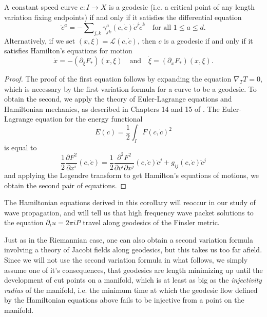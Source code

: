\begin{corollary}
  A constant speed curve $c: I \to X$ is a geodesic (i.e. a critical point of any length variation fixing endpoints) if and only if it satisfies the differential equation
  \[ \ddot{c}^a = - \sum\nolimits_{j,k} \gamma^a_{jk}(c,\dot{c}) \dot{c}^j \dot{c}^k \quad\text{for all $1 \leq a \leq d$}. \]
  Alternatively, if we set $(x,\xi) = \mathcal{L}(c,\dot{c})$, then $c$ is a geodesic if and only if it satisfies Hamilton's equations for motion
  \[ \dot{x} = - (\partial_\xi F_*)(x,\xi) \quad\text{and}\quad \dot{\xi} = (\partial_x F_*)(x,\xi). \]

\end{corollary}
\begin{proof}
  The proof of the first equation follows by expanding the equation $\nabla_T T = 0$, which is necessary by the first variation formula for a curve to be a geodesic. To obtain the second, we apply the theory of Euler-Lagrange equations and Hamiltonian mechanics, as described in Chapters 14 and 15 of \cite{Arnold}. The Euler-Lagrange equation for the energy functional
  \begin{equation}
    E(c) = \frac{1}{2} \int_I F(c,\dot{c})^2
  \end{equation}
  is equal to
  \begin{equation}
    \frac{1}{2} \frac{\partial F^2}{\partial x^i}(c,\dot{c}) = \frac{1}{2} \frac{\partial^2 F^2}{\partial v^i \partial x^j}(c,\dot{c}) \dot{c}^j + g_{ij}(c,\dot{c}) \ddot{c}^j
  \end{equation}
  and applying the Legendre transform to get Hamilton's equations of motions, we obtain the second pair of equations.
\end{proof}

\begin{remark}
  The Hamiltonian equations derived in this corollary will reoccur in our study of wave propagation, and will tell us that high frequency wave packet solutions to the equation $\partial_t u = 2 \pi i P$ travel along geodesics of the Finsler metric.
\end{remark}

Just as in the Riemannian case, one can also obtain a second variation formula involving a theory of Jacobi fields along geodesics, but this takes us too far afield. Since we will not use the second variation formula in what follows, we simply assume one of it's consequences, that geodesics are length minimizing up until the development of cut points on a manifold, which is at least as big as the \emph{injectivity radius} of the manifold, i.e. the minimum time at which the geodesic flow defined by the Hamiltonian equations above fails to be injective from a point on the manifold.

